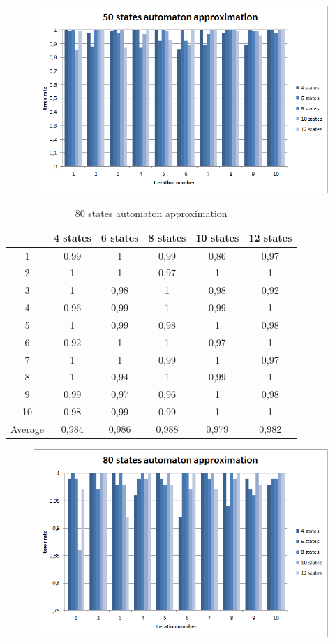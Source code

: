 \documentclass[runningheads,a4paper]{llncs}
\begin{document}
\begin{figure}
\centering
\includegraphics[scale=1]{9.png}
\end{figure}

\begin{table}[]
\centering
\caption{80 states automaton approximation}
\label{my-label}
\begin{tabular}{@{}cccccc@{}}
\toprule
        & 4 states & 6 states & 8 states & 10 states & 12 states    \\ \midrule
1       & 0,99     & 1        & 0,99     & 0,86      & 0,97 \\
2       & 1        & 1        & 0,97     & 1         & 1 \\
3       & 1        & 0,98     & 1        & 0,98      & 0,92 \\
4       & 0,96     & 0,99     & 1        & 0,99      & 1   \\
5       & 1        & 0,99     & 0,98     & 1         & 0,98   \\
6       & 0,92     & 1        & 1        & 0,97      & 1    \\
7       & 1        & 1        & 0,99     & 1         & 0,97    \\
8       & 1        & 0,94     & 1        & 0,99      & 1    \\
9       & 0,99     & 0,97     & 0,96     & 1         & 0,98 \\
10      & 0,98     & 0,99     & 0,99     & 1         & 1  \\
Average & 0,984    & 0,986    & 0,988    & 0,979     & 0,982  \\ \bottomrule
\end{tabular}
\end{table}


\begin{figure}
\centering
\includegraphics[scale=1]{10.png}
\end{figure} 
\end{document}
